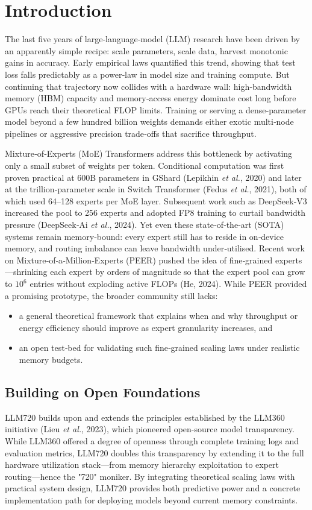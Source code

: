 \documentclass[11pt]{article}
\begin{document}
\section{Introduction}
The last five years of large‑language‑model (LLM) research have been driven by an apparently
simple recipe: scale parameters, scale data, harvest monotonic gains in accuracy. Early
empirical laws quantified this trend, showing that test loss falls predictably as a power‑law
in model size and training compute. But continuing that trajectory now collides with a
hardware wall: high‑bandwidth memory (HBM) capacity and memory‑access energy dominate
cost long before GPUs reach their theoretical FLOP limits. Training or serving a
dense‑parameter model beyond a few hundred billion weights demands either exotic
multi‑node pipelines or aggressive precision trade‑offs that sacrifice throughput.

Mixture‑of‑Experts (MoE) Transformers address this bottleneck by activating only a small
subset of weights per token. Conditional computation was first proven practical at 600B
parameters in GShard (Lepikhin \emph{et al.}, 2020) and later at the trillion‑parameter scale in
Switch Transformer (Fedus \emph{et al.}, 2021), both of which used 64–128 experts per MoE layer.
Subsequent work such as DeepSeek‑V3 increased the pool to 256 experts and adopted
FP8 training to curtail bandwidth pressure (DeepSeek‑Ai \emph{et al.}, 2024). Yet even these
state‑of‑the‑art (SOTA) systems remain memory‑bound: every expert still has to reside in
on‑device memory, and routing imbalance can leave bandwidth under‑utilised. Recent work
on Mixture‑of‑a‑Million‑Experts (PEER) pushed the idea of fine‑grained experts—shrinking
each expert by orders of magnitude so that the expert pool can grow to $10^6$ entries without
exploding active FLOPs (He, 2024). While PEER provided a promising prototype, the
broader community still lacks:
\begin{itemize}
  \item a general theoretical framework that explains when and why throughput or energy
efficiency should improve as expert granularity increases, and
  \item an open test‑bed for validating such fine‑grained scaling laws under realistic memory
budgets.
\end{itemize}

\subsection{Building on Open Foundations}
LLM720 builds upon and extends the principles established by the LLM360 initiative (Lieu \emph{et al.}, 2023), which pioneered open-source model transparency. While LLM360 offered a degree of openness through complete training logs and evaluation metrics, LLM720 doubles this transparency by extending it to the full hardware utilization stack—from memory hierarchy exploitation to expert routing—hence the "720" moniker. By integrating theoretical scaling laws with practical system design, LLM720 provides both predictive power and a concrete implementation path for deploying models beyond current memory constraints.
\end{document}
